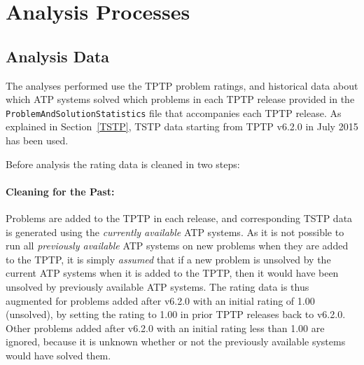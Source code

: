 \documentclass[runningheads]{llncs}
\begin{document}
\section{Analysis Processes}
\label{AnalysisProcesses}

\subsection{Analysis Data}
\label{AnalysisData}

The analyses performed use the TPTP problem ratings, and historical data about which
ATP systems solved which problems in each TPTP release provided in the 
{\tt ProblemAndSolutionStatistics} file that accompanies each TPTP release.
As explained in Section~\ref{TSTP}, TSTP data starting from TPTP v6.2.0 in July 2015 has been
used.

Before analysis the rating data is cleaned in two steps:

\paragraph{Cleaning for the Past:}
Problems are added to the TPTP in each release, and corresponding TSTP data is generated using 
the {\em currently available} ATP systems.
As it is not possible to run all {\em previously available} ATP systems on new problems when they 
are added to the TPTP, it is simply {\em assumed} that if a new problem is unsolved by the 
current ATP systems when it is added to the TPTP, then it would have been unsolved by 
previously available ATP systems.
The rating data is thus augmented for problems added after v6.2.0 with an initial rating of 1.00 
(unsolved), by setting the rating to 1.00 in prior TPTP releases back to v6.2.0.
Other problems added after v6.2.0 with an initial rating less than 1.00 are ignored, because 
it is unknown whether or not the previously available systems would have solved them.
\end{document}
